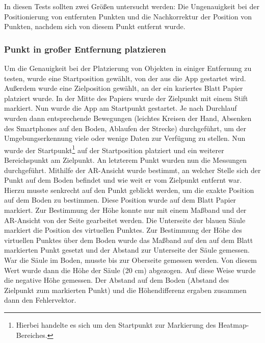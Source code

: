 \documentclass[10pt]{scrartcl}
\begin{document}
In diesen Tests sollten zwei Größen untersucht werden: Die Ungenauigkeit bei der Positionierung von entfernten Punkten und die Nachkorrektur der Position von Punkten, nachdem sich von diesem Punkt entfernt wurde.

\subsubsection{Punkt in großer Entfernung platzieren}
Um die Genauigkeit bei der Platzierung von Objekten in einiger Entfernung zu testen, wurde eine Startposition gewählt, von der aus die App gestartet wird. Außerdem wurde eine Zielposition gewählt, an der ein kariertes Blatt Papier platziert wurde. In der Mitte des Papiers wurde der Zielpunkt mit einem Stift markiert. Nun wurde die App am Startpunkt gestartet. Je nach Durchlauf wurden dann entsprechende Bewegungen (leichtes Kreisen der Hand, Absenken des Smartphones auf den Boden, Ablaufen der Strecke) durchgeführt, um der Umgebungserkennung viele oder wenige Daten zur Verfügung zu stellen. Nun wurde der Startpunkt\footnote{Hierbei handelte es sich um den Startpunkt zur Markierung des Heatmap-Bereiches.} auf der Startposition platziert und ein weiterer Bereichspunkt am Zielpunkt. An letzterem Punkt wurden nun die Messungen durchgeführt. Mithilfe der AR-Ansicht wurde bestimmt, an welcher Stelle sich der Punkt auf dem Boden befindet und wie weit er vom Zielpunkt entfernt war. Hierzu musste senkrecht auf den Punkt geblickt werden, um die exakte Position auf dem Boden zu bestimmen. Diese Position wurde auf dem Blatt Papier markiert. Zur Bestimmung der Höhe konnte nur mit einem Maßband und der AR-Ansicht von der Seite gearbeitet werden. Die Unterseite der blauen Säule markiert die Position des virtuellen Punktes. Zur Bestimmung der Höhe des virtuellen Punktes über dem Boden wurde das Maßband auf den auf dem Blatt markierten Punkt gesetzt und der Abstand zur Unterseite der Säule gemessen. War die Säule im Boden, musste bis zur Oberseite gemessen werden. Von diesem Wert wurde dann die Höhe der Säule (20 cm) abgezogen. Auf diese Weise wurde die negative Höhe gemessen. Der Abstand auf dem Boden (Abstand des Zielpunkt zum markierten Punkt) und die Höhendifferenz ergaben zusammen dann den Fehlervektor.
\end{document}
